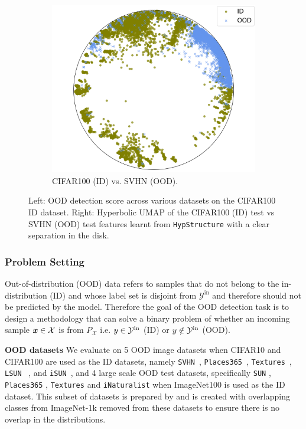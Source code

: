 \begin{figure}[h]
\begin{subfigure}[c]{0.21\textwidth}
        \includegraphics[width=\textwidth]{figures/hypstructure_poincare_disk_ID_OOD_1.png}
        \hspace{1pt}
        \caption{CIFAR100 (ID) vs. SVHN (OOD).}
        \label{fig:ood_viz}
    \end{subfigure}
    \caption{Left: OOD detection score across various datasets on the CIFAR100 ID dataset. Right: Hyperbolic UMAP of the CIFAR100 (ID) test vs SVHN (OOD) test features learnt from \texttt{HypStructure} with a clear separation in the \Poincare disk. }
\end{figure}

\subsubsection{Problem Setting}

Out-of-distribution (OOD) data refers to samples that do not belong to the in-distribution (ID) and whose label set is disjoint from $\mathcal{Y}^{\text{in}}$ and therefore should not be predicted by the model. Therefore the goal of the OOD detection task is to design a methodology that can solve a binary problem of whether an incoming sample ${\bm{x}} \in \mathcal{X}$ is from $P_{\mathcal{X}}$ i.e. $\*y \in \mathcal{Y}^{\text{in}}$ (ID)  or $\*y \notin \mathcal{Y}^{\text{in}}$ (OOD).


\textbf{OOD datasets} We evaluate on 5 OOD image datasets when CIFAR10 and CIFAR100 are used as the ID datasets, namely \texttt{SVHN}~\citep{svhn}, \texttt{Places365}~\citep{zhou2017places}, \texttt{Textures}~\citep{texture}, \texttt{LSUN} ~\citep{lsun}, and \texttt{iSUN}~\citep{isun}, and 4 large scale OOD test datasets, specifically \texttt{SUN} \citep{lsun}, \texttt{Places365} \citep{zhou2017places}, \texttt{Textures} \citep{texture} and \texttt{iNaturalist} \citep{Horn_2018_CVPR} when ImageNet100 is used as the ID dataset. This subset of datasets is prepared by \citep{ming2022delving} and is created with overlapping classes from ImageNet-1k removed from these datasets to ensure there is no overlap in the distributions.


